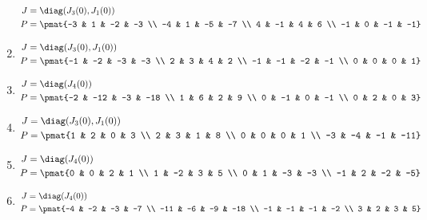 \begin{enumerate}
\begin{align*}
J &= \diag(J_{3}(0), J_{1}(0))\\
P &= \pmat{-3 & 1 & -2 & -3 \\ -4 & 1 & -5 & -7 \\ 4 & -1 & 4 & 6 \\ -1 & 0 & -1 & -1}
\end{align*}

\item

\begin{align*}
J &= \diag(J_{3}(0), J_{1}(0))\\
P &= \pmat{-1 & -2 & -3 & -3 \\ 2 & 3 & 4 & 2 \\ -1 & -1 & -2 & -1 \\ 0 & 0 & 0 & 1}
\end{align*}

\item

\begin{align*}
J &= \diag(J_{4}(0))\\
P &= \pmat{-2 & -12 & -3 & -18 \\ 1 & 6 & 2 & 9 \\ 0 & -1 & 0 & -1 \\ 0 & 2 & 0 & 3}
\end{align*}

\item

\begin{align*}
J &= \diag(J_{3}(0), J_{1}(0))\\
P &= \pmat{1 & 2 & 0 & 3 \\ 2 & 3 & 1 & 8 \\ 0 & 0 & 0 & 1 \\ -3 & -4 & -1 & -11}
\end{align*}

\item

\begin{align*}
J &= \diag(J_{4}(0))\\
P &= \pmat{0 & 0 & 2 & 1 \\ 1 & -2 & 3 & 5 \\ 0 & 1 & -3 & -3 \\ -1 & 2 & -2 & -5}
\end{align*}

\item

\begin{align*}
J &= \diag(J_{4}(0))\\
P &= \pmat{-4 & -2 & -3 & -7 \\ -11 & -6 & -9 & -18 \\ -1 & -1 & -1 & -2 \\ 3 & 2 & 3 & 5}
\end{align*}


\end{enumerate}
